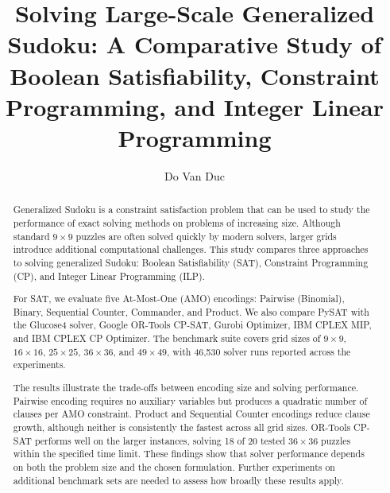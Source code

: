 \documentclass[a4paper,fleqn]{cas-sc}
\begin{document}
\let\WriteBookmarks\relax
\gdef\lastpage{\pageref{LastPage}}

\setcounter{topnumber}{3}
\setcounter{bottomnumber}{2}
\setcounter{totalnumber}{5}
\renewcommand{\topfraction}{0.95}
\renewcommand{\bottomfraction}{0.85}
\renewcommand{\textfraction}{0.05}
\renewcommand{\floatpagefraction}{0.65}
\setlength{\floatsep}{20pt plus 4pt minus 2pt}
\setlength{\textfloatsep}{20pt plus 4pt minus 2pt}
\setlength{\intextsep}{16pt plus 2pt minus 2pt}


\title[mode=title]{Solving Large-Scale Generalized Sudoku: A Comparative Study of Boolean Satisfiability, Constraint Programming, and Integer Linear Programming}

\author{Do Van Duc}

\begin{abstract}
Generalized Sudoku is a constraint satisfaction problem that can be used to study the performance of exact solving methods on problems of increasing size. Although standard $9 \times 9$ puzzles are often solved quickly by modern solvers, larger grids introduce additional computational challenges. This study compares three approaches to solving generalized Sudoku: Boolean Satisfiability (SAT), Constraint Programming (CP), and Integer Linear Programming (ILP).

For SAT, we evaluate five At-Most-One (AMO) encodings: Pairwise (Binomial), Binary, Sequential Counter, Commander, and Product. We also compare PySAT with the Glucose4 solver, Google OR-Tools CP-SAT, Gurobi Optimizer, IBM CPLEX MIP, and IBM CPLEX CP Optimizer. The benchmark suite covers grid sizes of $9 \times 9$, $16 \times 16$, $25 \times 25$, $36 \times 36$, and $49 \times 49$, with 46,530 solver runs reported across the experiments.

The results illustrate the trade-offs between encoding size and solving performance. Pairwise encoding requires no auxiliary variables but produces a quadratic number of clauses per AMO constraint. Product and Sequential Counter encodings reduce clause growth, although neither is consistently the fastest across all grid sizes. OR-Tools CP-SAT performs well on the larger instances, solving 18 of 20 tested $36 \times 36$ puzzles within the specified time limit. These findings show that solver performance depends on both the problem size and the chosen formulation. Further experiments on additional benchmark sets are needed to assess how broadly these results apply.
\end{abstract}
\end{document}
